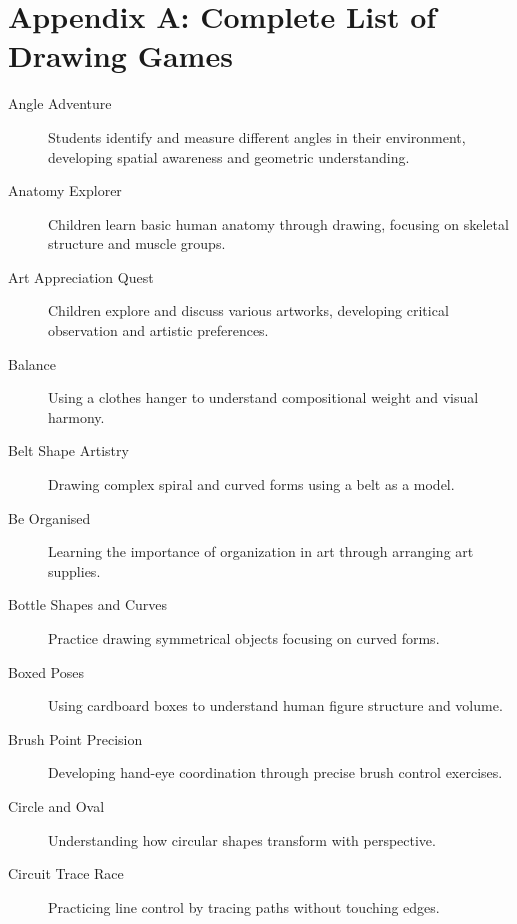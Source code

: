 \documentclass{article}
\begin{document}


\section*{Appendix A: Complete List of Drawing Games}
\label{appendix:games}

\begin{description}
    \item[Angle Adventure] Students identify and measure different angles in their environment, developing spatial awareness and geometric understanding.

    \item[Anatomy Explorer] Children learn basic human anatomy through drawing, focusing on skeletal structure and muscle groups.

    \item[Art Appreciation Quest] Children explore and discuss various artworks, developing critical observation and artistic preferences.

    \item[Balance] Using a clothes hanger to understand compositional weight and visual harmony.

    \item[Belt Shape Artistry] Drawing complex spiral and curved forms using a belt as a model.

    \item[Be Organised] Learning the importance of organization in art through arranging art supplies.

    \item[Bottle Shapes and Curves] Practice drawing symmetrical objects focusing on curved forms.

    \item[Boxed Poses] Using cardboard boxes to understand human figure structure and volume.

    \item[Brush Point Precision] Developing hand-eye coordination through precise brush control exercises.

    \item[Circle and Oval] Understanding how circular shapes transform with perspective.

    \item[Circuit Trace Race] Practicing line control by tracing paths without touching edges.


\end{description}
\end{document}
